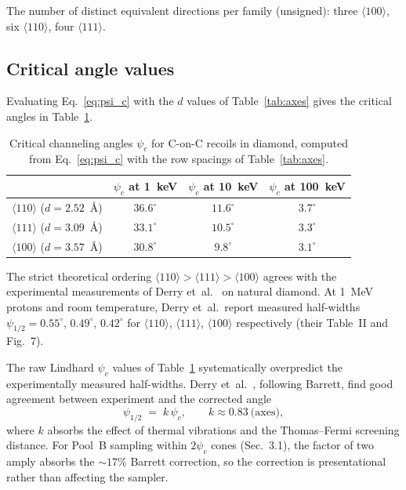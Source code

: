 \documentclass[11pt]{article}
\begin{document}
The number of distinct equivalent directions per family (unsigned): three
$\langle 100\rangle$, six $\langle 110\rangle$, four $\langle 111\rangle$.

\subsection{Critical angle values}

Evaluating Eq.~\eqref{eq:psi_c} with the $d$ values of Table~\ref{tab:axes}
gives the critical angles in Table~\ref{tab:psi}.

\begin{table}[h]
  \centering
  \begin{tabular}{lccc}
    \toprule
    & $\psi_c$ at \SI{1}{keV} & $\psi_c$ at \SI{10}{keV} & $\psi_c$ at \SI{100}{keV} \\
    \midrule
    $\langle 110\rangle$ ($d=2.52$~\AA) & $36.6^\circ$ & $11.6^\circ$ & $3.7^\circ$ \\
    $\langle 111\rangle$ ($d=3.09$~\AA) & $33.1^\circ$ & $10.5^\circ$ & $3.3^\circ$ \\
    $\langle 100\rangle$ ($d=3.57$~\AA) & $30.8^\circ$ & $9.8^\circ$  & $3.1^\circ$ \\
    \bottomrule
  \end{tabular}
  \caption{Critical channeling angles $\psi_c$ for C-on-C recoils in diamond,
    computed from Eq.~\eqref{eq:psi_c} with the row spacings of
    Table~\ref{tab:axes}.}
  \label{tab:psi}
\end{table}

The strict theoretical ordering $\langle 110\rangle > \langle 111\rangle >
\langle 100\rangle$ agrees with the experimental measurements of Derry
et~al.~\cite{Derry1982} on natural diamond. At \SI{1}{MeV} protons and room
temperature, Derry et~al.\ report measured half-widths $\psi_{1/2} = 0.55^\circ$,
$0.49^\circ$, $0.42^\circ$ for $\langle 110\rangle$, $\langle 111\rangle$,
$\langle 100\rangle$ respectively (their Table~II and Fig.~7).

The raw Lindhard $\psi_c$ values of Table~\ref{tab:psi} systematically
overpredict the experimentally measured half-widths. Derry
et~al.~\cite{Derry1982}, following Barrett, find good agreement between
experiment and the corrected angle
\begin{equation}
  \psi_{1/2} \;=\; k\,\psi_c, \qquad k \approx 0.83~\text{(axes)},
\end{equation}
where $k$ absorbs the effect of thermal vibrations and the Thomas--Fermi
screening distance. For Pool~B sampling within $2\psi_c$ cones (Sec.~3.1),
the factor of two amply absorbs the $\sim 17\%$ Barrett correction, so the
correction is presentational rather than affecting the sampler.
\end{document}
